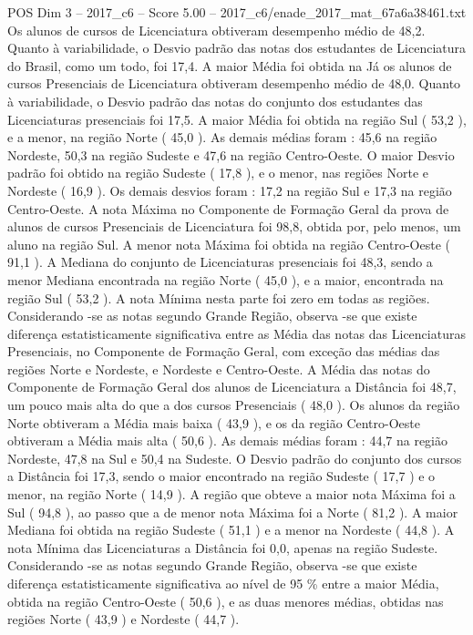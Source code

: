 \begin{textsample}{POS Dim 3 – 2017\_c6 – Score 5.00 – 2017\_c6/enade\_2017\_mat\_67a6a38461.txt}
Os alunos de cursos de Licenciatura obtiveram desempenho médio de 48,2.
Quanto à variabilidade, o Desvio padrão das notas dos estudantes de Licenciatura do Brasil, como um todo, foi 17,4.
A maior Média foi obtida na Já os alunos de cursos Presenciais de Licenciatura obtiveram desempenho médio de 48,0.
Quanto à variabilidade, o Desvio padrão das notas do conjunto dos estudantes das Licenciaturas presenciais foi 17,5.
A maior Média foi obtida na região Sul ( 53,2 ), e a menor, na região Norte ( 45,0 ).
As demais médias foram : 45,6 na região Nordeste, 50,3 na região Sudeste e 47,6 na região Centro-Oeste.
O maior Desvio padrão foi obtido na região Sudeste ( 17,8 ), e o menor, nas regiões Norte e Nordeste ( 16,9 ).
Os demais desvios foram : 17,2 na região Sul e 17,3 na região Centro-Oeste.
A nota Máxima no Componente de Formação Geral da prova de alunos de cursos Presenciais de Licenciatura foi 98,8, obtida por, pelo menos, um aluno na região Sul.
A menor nota Máxima foi obtida na região Centro-Oeste ( 91,1 ).
A Mediana do conjunto de Licenciaturas presenciais foi 48,3, sendo a menor Mediana encontrada na região Norte ( 45,0 ), e a maior, encontrada na região Sul ( 53,2 ).
A nota Mínima nesta parte foi zero em todas as regiões.
Considerando -se as notas segundo Grande Região, observa -se que existe diferença estatisticamente significativa entre as Média das notas das Licenciaturas Presenciais, no Componente de Formação Geral, com exceção das médias das regiões Norte e Nordeste, e Nordeste e Centro-Oeste.
A Média das notas do Componente de Formação Geral dos alunos de Licenciatura a Distância foi 48,7, um pouco mais alta do que a dos cursos Presenciais ( 48,0 ).
Os alunos da região Norte obtiveram a Média mais baixa ( 43,9 ), e os da região Centro-Oeste obtiveram a Média mais alta ( 50,6 ).
As demais médias foram : 44,7 na região Nordeste, 47,8 na Sul e 50,4 na Sudeste.
O Desvio padrão do conjunto dos cursos a Distância foi 17,3, sendo o maior encontrado na região Sudeste ( 17,7 ) e o menor, na região Norte ( 14,9 ).
A região que obteve a maior nota Máxima foi a Sul ( 94,8 ), ao passo que a de menor nota Máxima foi a Norte ( 81,2 ).
A maior Mediana foi obtida na região Sudeste ( 51,1 ) e a menor na Nordeste ( 44,8 ).
A nota Mínima das Licenciaturas a Distância foi 0,0, apenas na região Sudeste.
Considerando -se as notas segundo Grande Região, observa -se que existe diferença estatisticamente significativa ao nível de 95 \% entre a maior Média, obtida na região Centro-Oeste ( 50,6 ), e as duas menores médias, obtidas nas regiões Norte ( 43,9 ) e Nordeste ( 44,7 ).

\end{textsample}
